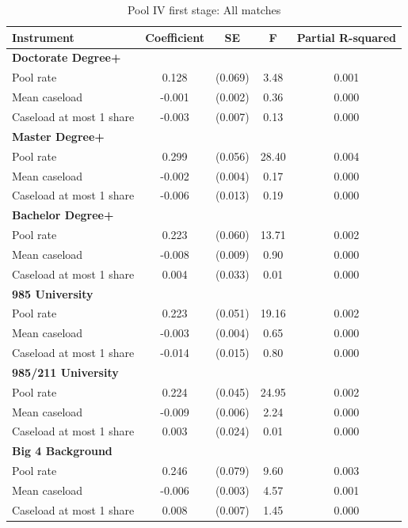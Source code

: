 \begin{table}[htbp]
\footnotesize
\def\sym#1{\ifmmode^{#1}\else\(^{#1}\)\fi}
\centering
\caption{Pool IV first stage: All matches}
\begin{threeparttable}
\begin{tabular}{p{}cccc}
\toprule
Instrument & Coefficient & SE & F & Partial R-squared \\
\midrule
\multicolumn{5}{l}{\textbf{Doctorate Degree+}} \\
Pool rate & 0.128 & (0.069) & 3.48 & 0.001 \\
Mean caseload & -0.001 & (0.002) & 0.36 & 0.000 \\
Caseload at most 1 share & -0.003 & (0.007) & 0.13 & 0.000 \\
\multicolumn{5}{l}{\textbf{Master Degree+}} \\
Pool rate & 0.299 & (0.056) & 28.40 & 0.004 \\
Mean caseload & -0.002 & (0.004) & 0.17 & 0.000 \\
Caseload at most 1 share & -0.006 & (0.013) & 0.19 & 0.000 \\
\multicolumn{5}{l}{\textbf{Bachelor Degree+}} \\
Pool rate & 0.223 & (0.060) & 13.71 & 0.002 \\
Mean caseload & -0.008 & (0.009) & 0.90 & 0.000 \\
Caseload at most 1 share & 0.004 & (0.033) & 0.01 & 0.000 \\
\multicolumn{5}{l}{\textbf{985 University}} \\
Pool rate & 0.223 & (0.051) & 19.16 & 0.002 \\
Mean caseload & -0.003 & (0.004) & 0.65 & 0.000 \\
Caseload at most 1 share & -0.014 & (0.015) & 0.80 & 0.000 \\
\multicolumn{5}{l}{\textbf{985/211 University}} \\
Pool rate & 0.224 & (0.045) & 24.95 & 0.002 \\
Mean caseload & -0.009 & (0.006) & 2.24 & 0.000 \\
Caseload at most 1 share & 0.003 & (0.024) & 0.01 & 0.000 \\
\multicolumn{5}{l}{\textbf{Big 4 Background}} \\
Pool rate & 0.246 & (0.079) & 9.60 & 0.003 \\
Mean caseload & -0.006 & (0.003) & 4.57 & 0.001 \\
Caseload at most 1 share & 0.008 & (0.007) & 1.45 & 0.000 \\

\end{tabular}
\end{threeparttable}
\end{table}
